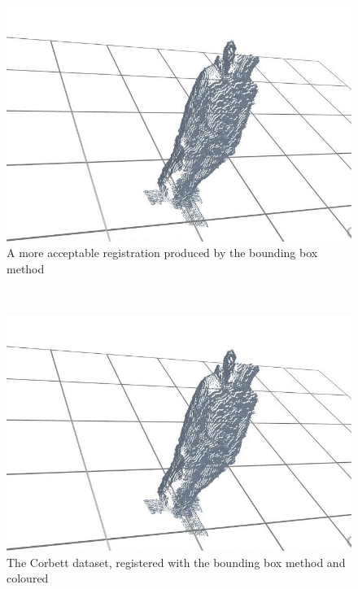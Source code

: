 \begin{figure}[h!]
    \begin{center}
        \includegraphics[scale=0.3]{zscreenshots/wilko-good.jpg}
        \caption{A more acceptable registration produced by the bounding box method}
        \label{fig:wilko good}
    \end{center}
\end{figure} \\

\begin{figure}[h!]
    \begin{center}
        \includegraphics[scale=0.3]{zscreenshots/wilko-good.jpg}
        \caption{The Corbett dataset, registered with the bounding box method and coloured}
        \label{fig:corbett good}
    \end{center}
\end{figure} \\

